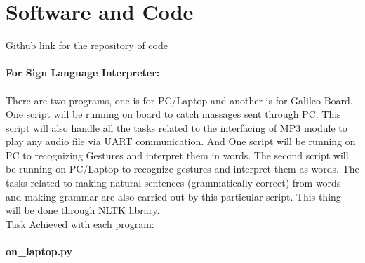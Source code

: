 \documentclass[a4paper,12pt,oneside]{book}
\begin{document}
\section{Software and Code}
\href{https://github.com/eYSIP-2016/eYSIP-2016-Sign-Language-Interpreter-Leap-Motion-Sensor-}{Github link} for the repository of code\\
\vspace{.3cm}\\
\textbf{For Sign Language Interpreter:}\\
\vspace{.3cm}\\
There are two programs, one is for PC/Laptop and another is for Galileo Board. One script will be running on board to catch massages sent through PC. This script will also handle all the tasks related to the interfacing of MP3 module to play any audio file via UART communication. And One script will be running on PC to recognizing Gestures and interpret them in words. The second script will be running on PC/Laptop to recognize gestures and interpret them as words.
The tasks related to making natural sentences (grammatically correct) from words and making grammar are also carried out by this particular script. This thing will be done through NLTK library.\\
Task Achieved with each program:\\
\vspace{1cm}\\
\textbf{\Large{on\_laptop.py}}\\
\end{document}

